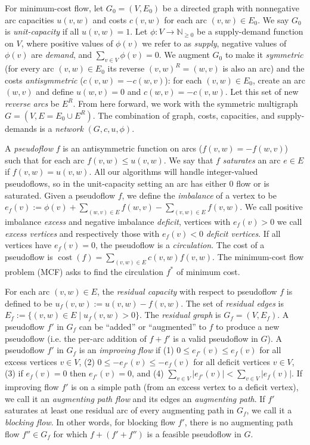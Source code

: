 \documentclass[11pt]{article}
\def\ints{\mathbb{N}}
\def\fsupply{\phi}
\theoremstyle{plain}
\def\cost{\operatorname{cost}}
\begin{document}
For minimum-cost flow, let $G_0 = (V, E_0)$ be a directed graph with
nonnegative arc capacities $u(v, w)$ and costs $c(v, w)$ for each arc
$(v, w) \in E_0$.
We say $G_0$ is \emph{unit-capacity} if all $u(v, w) = 1$.
Let $\fsupply: V \to \ints_{\geq 0}$ be a supply-demand function on $V$,
where positive values of $\fsupply(v)$ we refer to as \emph{supply},
negative values of $\fsupply(v)$ are \emph{demand}, and
$\sum_{v \in V} \fsupply(v) = 0$.
We augment $G_0$ to make it \emph{symmetric} (for every arc $(v, w) \in E_0$
its reverse $(v, w)^R = (w, v)$ is also an arc) and the costs
\emph{antisymmetric} ($c(v, w) = -c(w, v)$): for each $(v, w) \in E_0$, create
an arc $(w, v)$ and define $u(w, v) = 0$ and $c(w, v) = -c(v, w)$.
Let this set of new \emph{reverse arcs} be $E^R$.
From here forward, we work with the symmetric multigraph
$G = (V, E = E_0 \cup E^R)$.
The combination of graph, costs, capacities, and supply-demands is a
\emph{network} $(G, c, u, \fsupply)$.

A \emph{pseudoflow} $f$ is an antisymmetric function on arcs
($f(v, w) = -f(w, v)$) such that for each arc $f(v, w) \leq u(v, w)$.
We say that $f$ \emph{saturates} an arc $e \in E$ if $f(v, w) = u(v, w)$.
All our algorithms will handle integer-valued pseudoflows, so in the
unit-capacity setting an arc has either 0 flow or is saturated.
Given a pseudoflow $f$, we define the \emph{imbalance} of a vertex to be
$e_f(v) := \fsupply(v) + \sum_{(w, v) \in E}{f(w, v)} - \sum_{(v, w) \in E}{f(v, w)}$.
We call positive imbalance \emph{excess} and negative imbalance \emph{deficit},
vertices with $e_f(v) > 0$ we call \emph{excess vertices} and respectively
those with $e_f(v) < 0$ \emph{deficit vertices}.
If all vertices have $e_f(v) = 0$, the pseudoflow is a \emph{circulation}.
The cost of a pseudoflow is $\cost(f) = \sum_{(v, w) \in E} c(v, w) f(v, w)$.
The minimum-cost flow problem (MCF) asks to find the circulation $f^*$ of
minimum cost.

For each arc $(v, w) \in E$, the \emph{residual capacity} with respect to
pseudoflow $f$ is defined to be $u_f(v, w) := u(v, w) - f(v, w)$.
The set of \emph{residual edges} is
$E_f := \{(v, w) \in E \mid u_f(v, w) > 0\}$.
The \emph{residual graph} is $G_f = (V, E_f)$.
A pseudoflow $f'$ in $G_f$ can be ``added'' or ``augmented'' to $f$ to produce
a new pseudoflow (i.e. the per-arc addition of $f + f'$ is a valid pseudoflow
in $G$).
A pseudoflow $f'$ in $G_f$ is an \emph{improving flow} if (1)
$0 \leq e_{f'}(v) \leq e_f(v)$ for all excess vertices $v \in V$,
(2) $0 \leq -e_{f'}(v) \leq -e_f(v)$ for all deficit vertices $v \in V$,
(3) if $e_f(v) = 0$ then $e_{f'}(v) = 0$, and (4)
$\sum_{v \in V} |e_{f'}(v)| < \sum_{v \in V} |e_f(v)|$.
If improving flow $f'$ is on a simple path (from an excess vertex to a deficit
vertex), we call it an \emph{augmenting path flow} and its edges an
\emph{augmenting path}.
If $f'$ saturates at least one residual arc of every augmenting path in $G_f$,
we call it a \emph{blocking flow}.
In other words, for blocking flow $f'$, there is no augmenting path flow
$f'' \in G_f$ for which $f + (f' + f'')$ is a feasible pseudoflow in $G$.
\end{document}
